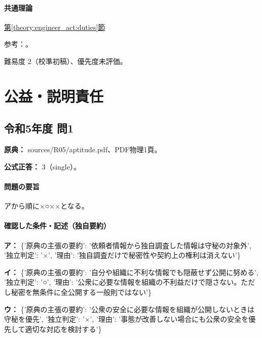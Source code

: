 \paragraph{共通理論} \hyperref[theory:engineer_act:duties]{第\ref*{theory:engineer_act:duties}節}

\par 参考：\cite{engineer_act_current}。

\par 難易度 2（校準初稿）、優先度未評価。

\section{公益・説明責任}

\subsection{令和5年度 問1}
\label{q:r05-reg-apt-01}

\noindent\textbf{原典：} sources/R05/aptitude.pdf、PDF物理1頁。

\textbf{公式正答：} 3（single）。

\paragraph{問題の要旨} アから順に×○××となる。

\paragraph{確認した条件・記述（独自要約）}\mbox{}\par

\noindent\textbf{ア：} \{'原典の主張の要約': '依頼者情報から独自調査した情報は守秘の対象外', '独立判定': '×', '理由': '独自調査だけで秘密性や契約上の権利は消えない'\}\par

\noindent\textbf{イ：} \{'原典の主張の要約': '自分や組織に不利な情報でも隠蔽せず公開に努める', '独立判定': '○', '理由': '公衆に必要な情報を組織の不利益だけで隠さない。ただし秘密を無条件に全公開する一般則ではない'\}\par

\noindent\textbf{ウ：} \{'原典の主張の要約': '公衆の安全に必要な情報を組織が公開しないときは守秘を優先', '独立判定': '×', '理由': '事態が改善しない場合にも公衆の安全を優先して適切な対応を検討する'\}\par

